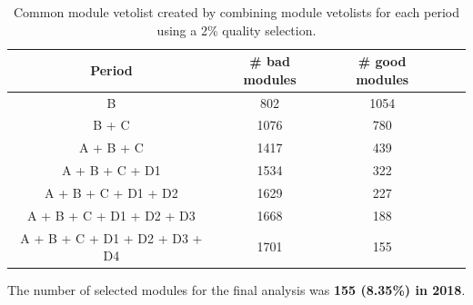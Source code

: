 \begin{table}[h]
\caption[Common Module Vetolist with Quality Selection]{Common module vetolist created by combining module vetolists for each period using a 2\% quality selection.}
    \label{tab:2commonveto}
  \begin{center}
    \begin{tabular}{ccccc}  
    \textbf{Period}   & \textbf{\# bad modules} & \textbf{\# good modules} \\  \hline
     B      &  802   &  1054    \\ 
     B + C      &  1076   &  780    \\ 
     A + B + C      &  1417   &  439    \\  
     A + B + C + D1      &   1534  &   322    \\ 
     A + B + C + D1 + D2      &   1629 &    227   \\ 
     A + B + C + D1 + D2 + D3     &   1668 &   188    \\ 
     A + B + C + D1 + D2 + D3 + D4     &  1701 &     155  \\ 
   \end{tabular}
  \end{center}
\end{table}


The number of selected modules for the final analysis was \textbf{155 (8.35\%) in 2018}. 

